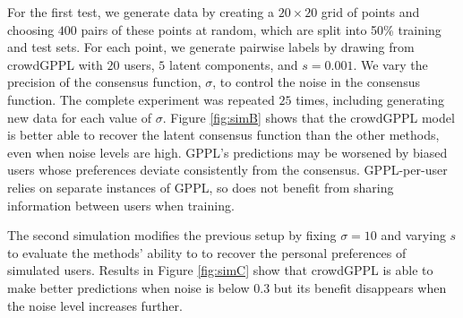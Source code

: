For the first test,
we generate data by creating a $20\times 20$ grid of points and choosing $400$ pairs of these points at random,
which are split into  50\% training and test sets.
For each point, we generate pairwise labels by drawing from crowdGPPL
with $20$ users, $5$ latent components, and 
$s=0.001$.
We vary the precision of the consensus function, $\sigma$, to control the noise in 
the consensus function. 
The complete experiment was repeated $25$ times, including generating new data 
for each value of $\sigma$.
Figure \ref{fig:simB} shows that the crowdGPPL model is better able to recover the latent consensus
function than the other methods, even when noise levels are high. 
GPPL's predictions may be worsened by biased users whose preferences deviate
 consistently from the consensus. GPPL-per-user relies on separate instances of GPPL, so 
 does not benefit from sharing information between users when training.

The second simulation modifies the previous setup by fixing $\sigma = 10$ and varying $s$
to evaluate the methods'
ability to to recover the personal preferences of simulated users.
Results in Figure \ref{fig:simC} show that crowdGPPL is able to make better 
predictions when noise is below $0.3$ but its benefit disappears when 
the noise level increases further. 

